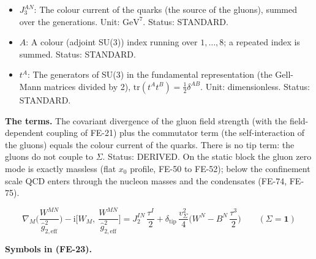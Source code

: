 \documentclass[
  10pt,
]{article}
\begin{document}
\begin{itemize}
  dimensionless. Status: STANDARD.
\item
  \(J_3^{AN}\): The colour current of the quarks (the source of the
  gluons), summed over the generations. Unit: \(\mathrm{GeV}^{7}\).
  Status: STANDARD.
\item
  \(A\): A colour (adjoint SU(3)) index running over \(1, \dots, 8\); a
  repeated index is summed. Status: STANDARD.
\item
  \(t^A\): The generators of SU(3) in the fundamental representation
  (the Gell-Mann matrices divided by 2),
  \(\mathrm{tr}(t^At^B) = \frac12\delta^{AB}\). Unit: dimensionless.
  Status: STANDARD.
\end{itemize}

\textbf{The terms.} The covariant divergence of the gluon field strength
(with the field-dependent coupling of FE-21) plus the commutator term
(the self-interaction of the gluons) equals the colour current of the
quarks. There is no tip term: the gluons do not couple to \(\Sigma\).
Status: DERIVED. On the static block the gluon zero mode is exactly
massless (flat \(x_0\) profile, FE-50 to FE-52); below the confinement
scale QCD enters through the nucleon masses and the condensates (FE-74,
FE-75).

\[
\nabla_M\Big(\frac{W^{MN}}{\hat g_{2,\mathrm{eff}}^2}\Big) - \mathrm{i}\Big[W_M,\ \frac{W^{MN}}{\hat
 g_{2,\mathrm{eff}}^2}\Big]
 = J_2^{IN}\,\frac{\tau^I}{2} + \delta_{\mathrm{tip}}\,\frac{v_\Sigma^2}{4}\Big(W^N -
 B^N\,\frac{\tau^3}{2}\Big)\qquad
 (\Sigma = \mathbf{1}) \tag{FE-23}
\]

\textbf{Symbols in (FE-23).}
\end{document}

